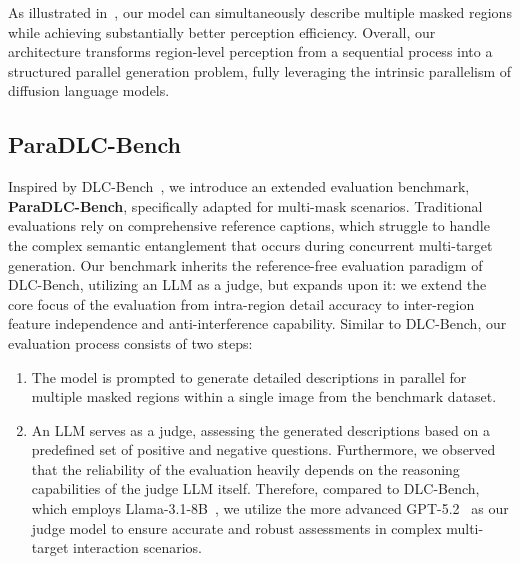As illustrated in~, our model can simultaneously describe multiple masked regions while achieving substantially better perception efficiency. Overall, our architecture transforms region-level perception from a sequential process into a structured parallel generation problem, fully leveraging the intrinsic parallelism of diffusion language models.





%
\vspace{-2mm}
\subsection{ParaDLC-Bench}
\vspace{-2mm}
Inspired by DLC-Bench~\citep{lian2025describe}, we introduce an extended evaluation benchmark, \textbf{ParaDLC-Bench}, specifically adapted for multi-mask scenarios. Traditional evaluations rely on comprehensive reference captions, which struggle to handle the complex semantic entanglement that occurs during concurrent multi-target generation. 
%
Our benchmark inherits the reference-free evaluation paradigm of DLC-Bench, utilizing an LLM as a judge, but expands upon it: we extend the core focus of the evaluation from intra-region detail accuracy to inter-region feature independence and anti-interference capability.
%
Similar to DLC-Bench, our evaluation process consists of two steps:
\begin{enumerate}
    \item The model is prompted to generate detailed descriptions in parallel for multiple masked regions within a single image from the benchmark dataset.
    \item An LLM serves as a judge, assessing the generated descriptions based on a predefined set of positive and negative questions. 
    Furthermore, we observed that the reliability of the evaluation heavily depends on the reasoning capabilities of the judge LLM itself. Therefore, compared to DLC-Bench, which employs Llama-3.1-8B~\citep{grattafiori2024llama}, we utilize the more advanced GPT-5.2~\citep{gpt5.2} as our judge model to ensure accurate and robust assessments in complex multi-target interaction scenarios.
\end{enumerate}

